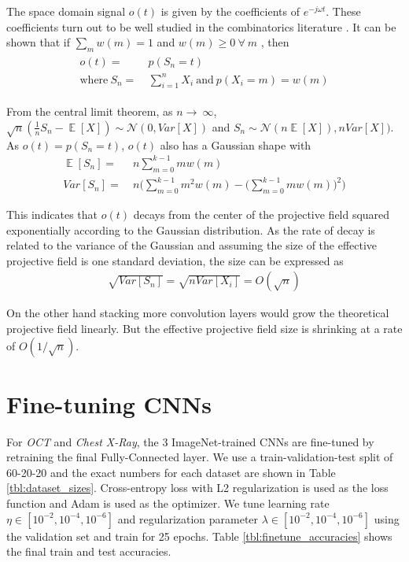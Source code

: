 The space domain signal $o(t)$ is given by the coefficients of $e^{-j\omega t}$.
These coefficients turn out to be well studied in the combinatorics literature \cite{eger2013restricted}.
It can be shown that if $\sum_{m}w(m) = 1$  and $w(m) \geq 0 ~\forall~ m$ , then
\begin{align}
\begin{split}
	o(t) =&~ p(S_n=t)\\ 
	\text{where}~ S_n =&~ \sum_{i=1}^{n} X_i ~\text{and}~p(X_i=m) = w(m)
\end{split}
\end{align}

From the central limit theorem, as $n \rightarrow~\infty$, $\sqrt{n}(\frac{1}{n}S_n - \mathop{\mathbb{E}}[X]) \sim \mathcal{N}(0, Var[X])$ and $S_n \sim \mathcal{N}(n\mathop{\mathbb{E}}[X]), nVar[X])$.
As $o(t) = p(S_n=t)$, $o(t)$ also has a Gaussian shape with
\begin{align}
	\mathop{\mathbb{E}}[S_n] =&~ n\sum_{m=0}^{k-1}mw(m)\\
	Var[S_n] =&~ n \Bigg(\sum_{m=0}^{k-1}m^2w(m) - \Big(\sum_{m=0}^{k-1}mw(m)\Big)^2 \Bigg)
\end{align}

This indicates that $o(t)$ decays from the center of the projective field squared exponentially according to the Gaussian distribution.
As the rate of decay is related to the variance of the Gaussian and assuming the size of the effective projective field is one standard deviation, the size can be expressed as
\begin{align}
	\sqrt{Var[S_n]} = \sqrt{nVar[X_i]} = O(\sqrt{n})
\end{align}

On the other hand stacking more convolution layers would grow the theoretical projective field linearly. But the effective projective field size is shrinking at a rate of $O(1/\sqrt{n})$.


\section{Fine-tuning CNNs}

For \textit{OCT} and \textit{Chest X-Ray}, the 3 ImageNet-trained CNNs are fine-tuned by retraining the final Fully-Connected layer.
We use a train-validation-test split of 60-20-20 and the exact numbers for each dataset are shown in Table \ref{tbl:dataset_sizes}.
Cross-entropy loss with L2 regularization is used as the loss function and  Adam \cite{kingma2014adam} is used as the optimizer.
We tune learning rate $\eta \in [10^{-2}, 10^{-4}, 10^{-6}]$ and regularization parameter $\lambda \in [10^{-2}, 10^{-4}, 10^{-6}]$ using the validation set and train for 25 epochs.
Table \ref{tbl:finetune_accuracies} shows the final train and test accuracies.

